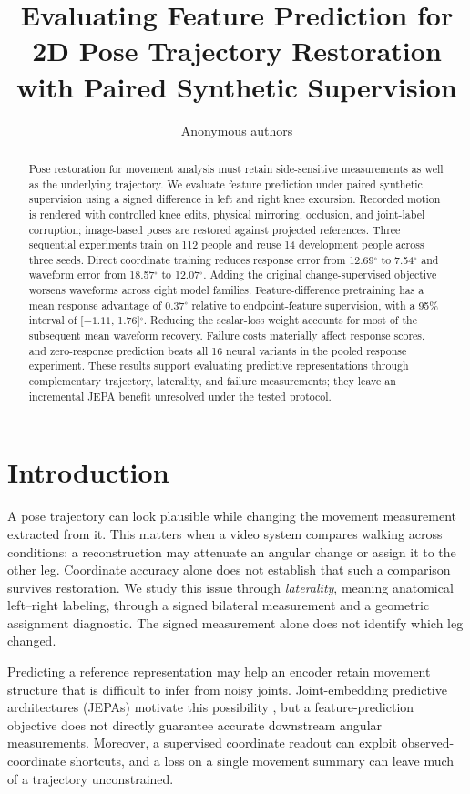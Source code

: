 \documentclass{article}
\title{Evaluating Feature Prediction for 2D Pose Trajectory Restoration with Paired Synthetic Supervision}
\author{Anonymous authors}
\newcommand{\degunit}{^{\circ}}
\begin{document}
\maketitle
\begin{abstract}
Pose restoration for movement analysis must retain side-sensitive measurements as well as the underlying trajectory. We evaluate feature prediction under paired synthetic supervision using a signed difference in left and right knee excursion. Recorded motion is rendered with controlled knee edits, physical mirroring, occlusion, and joint-label corruption; image-based poses are restored against projected references. Three sequential experiments train on 112 people and reuse 14 development people across three seeds. Direct coordinate training reduces response error from 12.69$\degunit$ to 7.54$\degunit$ and waveform error from 18.57$\degunit$ to 12.07$\degunit$. Adding the original change-supervised objective worsens waveforms across eight model families. Feature-difference pretraining has a mean response advantage of 0.37$\degunit$ relative to endpoint-feature supervision, with a 95\% interval of [$-1.11$, 1.76]$\degunit$. Reducing the scalar-loss weight accounts for most of the subsequent mean waveform recovery. Failure costs materially affect response scores, and zero-response prediction beats all 16 neural variants in the pooled response experiment. These results support evaluating predictive representations through complementary trajectory, laterality, and failure measurements; they leave an incremental JEPA benefit unresolved under the tested protocol.
\end{abstract}

\section{Introduction}
A pose trajectory can look plausible while changing the movement measurement extracted from it. This matters when a video system compares walking across conditions: a reconstruction may attenuate an angular change or assign it to the other leg. Coordinate accuracy alone does not establish that such a comparison survives restoration. We study this issue through \emph{laterality}, meaning anatomical left--right labeling, through a signed bilateral measurement and a geometric assignment diagnostic. The signed measurement alone does not identify which leg changed.

Predicting a reference representation may help an encoder retain movement structure that is difficult to infer from noisy joints. Joint-embedding predictive architectures (JEPAs) motivate this possibility \citep{assran2023ijepa,bardes2024vjepa}, but a feature-prediction objective does not directly guarantee accurate downstream angular measurements. Moreover, a supervised coordinate readout can exploit observed-coordinate shortcuts, and a loss on a single movement summary can leave much of a trajectory unconstrained.
\end{document}
